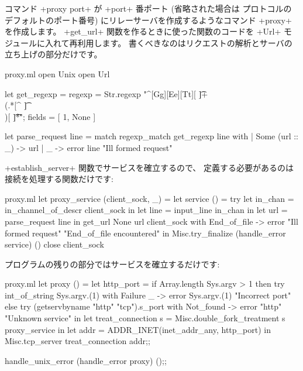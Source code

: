 コマンド \ml+proxy port+ が \ml+port+ 番ポート (省略された場合は \http プロトコルの
デフォルトのポート番号) にリレーサーバを作成するようなコマンド \ml+proxy+ を作成します。
\ml+get_url+ 関数を作るときに使った関数のコードを \ml+Url+ モジュールに入れて再利用します。
書くべきなのはリクエストの解析とサーバの立ち上げの部分だけです。
%
\begin{listingcodefile}{proxy.ml}
open Unix
open Url

let get_regexp =
  { regexp = Str.regexp "^[Gg][Ee][Tt][ \t]+\\(.*[^ \t]\\)[ \t]*\r";
    fields = [ 1, None ] }

let parse_request line = match regexp_match get_regexp line with
  | Some (url :: _) -> url
  | _ -> error line "Ill formed request"
\end{listingcodefile}
%
\ml+establish_server+ 関数でサービスを確立するので、
定義する必要があるのは接続を処理する関数だけです:
%
\begin{listingcodefile}{proxy.ml}
let proxy_service (client_sock, _) =
  let service () =
    try
      let in_chan = in_channel_of_descr client_sock in
      let line = input_line in_chan in
      let url = parse_request line in
      get_url None url client_sock
    with End_of_file ->
      error "Ill formed request" "End_of_file encountered"
  in
  Misc.try_finalize
    (handle_error service) ()
    close client_sock
\end{listingcodefile}
\label{page/get_url}
%
プログラムの残りの部分ではサービスを確立するだけです:
%
\begin{listingcodefile}{proxy.ml}
let proxy () =
  let http_port =
    if Array.length Sys.argv > 1 then
      try int_of_string Sys.argv.(1)
      with Failure _ -> error Sys.argv.(1) "Incorrect port"
    else
      try (getservbyname "http" "tcp").s_port
      with Not_found -> error "http" "Unknown service"
  in
  let treat_connection s = Misc.double_fork_treatment s proxy_service in
  let addr = ADDR_INET(inet_addr_any, http_port) in
  Misc.tcp_server treat_connection addr;;

handle_unix_error (handle_error proxy) ();;
\end{listingcodefile}

